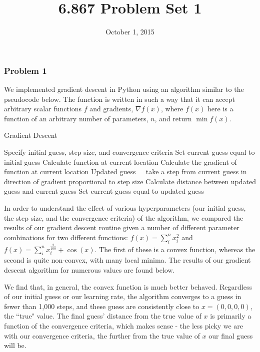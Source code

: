 \documentclass[10pt]{article}
\begin{document}
	\title{6.867 Problem Set 1}
	\date{October 1, 2015}
	\maketitle
	
\subsubsection*{Problem 1}

We implemented gradient descent in Python using an algorithm similar to the pseudocode below. The function is written in such a way that it can accept arbitrary scalar functions $f$ and gradients, $\nabla f(x)$, where $f(x)$ here is a function of an arbitrary number of parameters, $n$, and return $\min{f(x)}$.

\begin{algorithm}
\caption{Gradient Descent}
\label{GradDescent}
\begin{algorithmic}[1]
\State Specify initial guess, step size, and convergence criteria
\State Set current guess equal to initial guess
\State Calculate function at current location
\State Calculate the gradient of function at current location
\State Updated guess = take a step from current guess in direction of gradient proportional to step size
\State Calculate distance between updated guess and current guess
\State Set current guess equal to updated guess
\EndWhile{}
\EndProcedure
\end{algorithmic}
\end{algorithm}

In order to understand the effect of various hyperparameters (our initial guess, the step size, and the convergence criteria) of the algorithm, we compared the results of our gradient descent routine given a number of different parameter combinations for two different functions: $f(x) = \sum_i^n x_i^2$ and $f(x) = \sum_i^n x_i^{\frac{2}{100}} + \cos(x)$. The first of these is a convex function, whereas the second is quite non-convex, with many local minima. The results of our gradient descent algorithm for numerous values are found below.

We find that, in general, the convex function is much better behaved. Regardless of our initial guess or our learning rate, the algorithm converges to a guess in fewer than 1,000 steps, and these guess are consistently close to $x = (0,0,0,0)$, the ``true" value. The final guess' distance from the true value of $x$ is primarily a function of the convergence criteria, which makes sense - the less picky we are with our convergence criteria, the further from the true value of $x$ our final guess will be.
\end{document}
